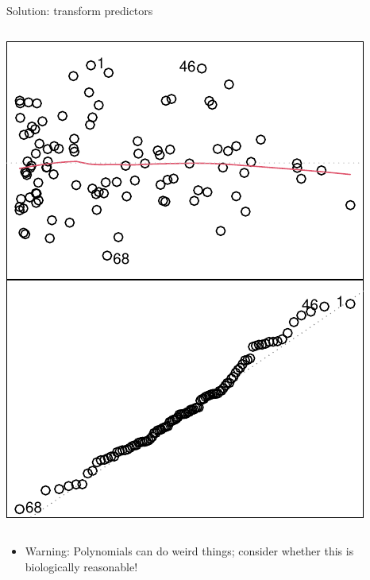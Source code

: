 \documentclass[
  ignorenonframetext,
  aspectratio=169]{beamer}
\providecommand{\tightlist}{%
  \setlength{\itemsep}{0pt}\setlength{\parskip}{0pt}}
\begin{document}
\begin{frame}[fragile]{Solution: transform predictors}
\begin{columns}[T]
\begin{column}{0.48\textwidth}
\includegraphics{03-Lecture_files/figure-beamer/unnamed-chunk-32-1.pdf}
\end{column}
\end{columns}

\small

\begin{itemize}[<+->]
\tightlist
\item
  Warning: Polynomials can do weird things; consider whether this is
  biologically reasonable!
\end{itemize}
\end{frame}
\end{document}

